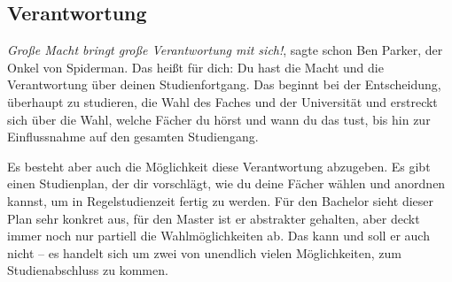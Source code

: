 
\subsection{Verantwortung}
	\textit{Große Macht bringt große Verantwortung mit sich!}, sagte schon Ben Parker, der Onkel von Spiderman. Das heißt für dich: Du hast die Macht und die Verantwortung über deinen Studienfortgang. Das beginnt bei der Entscheidung, überhaupt zu studieren, die Wahl des Faches und der Universität und erstreckt sich über die Wahl, welche Fächer du hörst und wann du das tust, bis hin zur Einflussnahme auf den gesamten Studiengang.

	Es besteht aber auch die Möglichkeit diese Verantwortung abzugeben. Es gibt einen Studienplan, der dir vorschlägt, wie du deine Fächer wählen und anordnen kannst, um in Regelstudienzeit fertig zu werden. Für den Bachelor sieht dieser Plan sehr konkret aus, für den Master ist er abstrakter gehalten, aber deckt immer noch nur partiell die Wahlmöglichkeiten ab. Das kann und soll er auch nicht -- es handelt sich um zwei von unendlich vielen Möglichkeiten, zum Studienabschluss zu kommen.
